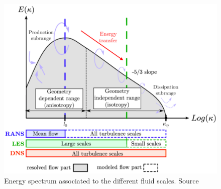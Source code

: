 \begin{figure}[!ht]
\centering
\includegraphics[width=\linewidth,keepaspectratio]{fig/applications/ls89/energy_cascade.png}
\caption{Energy spectrum associated to the different fluid scales. Source~\cite{Fransen2013}}
\label{fig:energy_cascade}
\end{figure}





